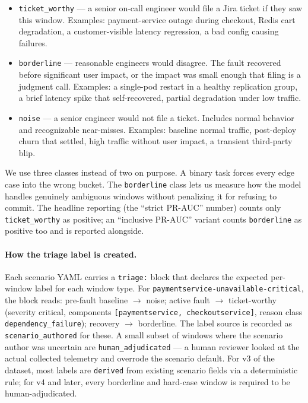 \begin{itemize}
\item \texttt{ticket\_worthy} --- a senior on-call engineer would file a Jira ticket if they saw this window. Examples: payment-service outage during checkout, Redis cart degradation, a customer-visible latency regression, a bad config causing failures.
\item \texttt{borderline} --- reasonable engineers would disagree. The fault recovered before significant user impact, or the impact was small enough that filing is a judgment call. Examples: a single-pod restart in a healthy replication group, a brief latency spike that self-recovered, partial degradation under low traffic.
\item \texttt{noise} --- a senior engineer would not file a ticket. Includes normal behavior and recognizable near-misses. Examples: baseline normal traffic, post-deploy churn that settled, high traffic without user impact, a transient third-party blip.
\end{itemize}

We use three classes instead of two on purpose. A binary task forces every edge case into the wrong bucket. The \texttt{borderline} class lets us measure how the model handles genuinely ambiguous windows without penalizing it for refusing to commit. The headline reporting (the ``strict PR-AUC'' number) counts only \texttt{ticket\_worthy} as positive; an ``inclusive PR-AUC'' variant counts \texttt{borderline} as positive too and is reported alongside.

\paragraph{How the triage label is created.} Each scenario YAML carries a \texttt{triage:} block that declares the expected per-window label for each window type. For \texttt{paymentservice-unavailable-critical}, the block reads: pre-fault baseline $\rightarrow$ noise; active fault $\rightarrow$ ticket-worthy (severity critical, components \texttt{[paymentservice, checkoutservice]}, reason class \texttt{dependency\_failure}); recovery $\rightarrow$ borderline. The label source is recorded as \texttt{scenario\_authored} for these. A small subset of windows where the scenario author was uncertain are \texttt{human\_adjudicated} --- a human reviewer looked at the actual collected telemetry and overrode the scenario default. For v3 of the dataset, most labels are \texttt{derived} from existing scenario fields via a deterministic rule; for v4 and later, every borderline and hard-case window is required to be human-adjudicated.


